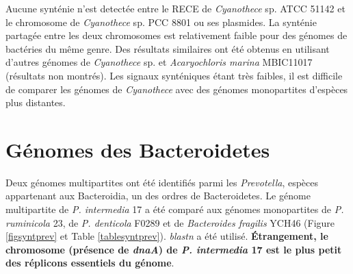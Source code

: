 Aucune synténie n'est detectée entre le RECE de \textit{Cyanothece} sp. ATCC 51142 et le chromosome de \textit{Cyanothece} sp. PCC 8801 ou ses plasmides. La synténie partagée entre les deux chromosomes est relativement faible pour des génomes de bactéries du même genre. Des résultats similaires ont été obtenus en utilisant d'autres génomes de \textit{Cyanothece} sp. et \textit{Acaryochloris marina} MBIC11017 (résultats non montrés). Les signaux synténiques étant très faibles, il est difficile de comparer les génomes de \textit{Cyanothece} avec des génomes monopartites d'espèces plus distantes.



\section{Génomes des Bacteroidetes}\label{parprev}
	Deux génomes multipartites ont été identifiés parmi les \textit{Prevotella}, espèces appartenant aux Bacteroidia, un des ordres de Bacteroidetes. Le génome multipartite de \textit{P. intermedia} 17 a été comparé aux génomes monopartites de \textit{P. ruminicola} 23, de \textit{P. denticola} F0289 et de \textit{Bacteroides fragilis} YCH46 (Figure \ref{figsyntprev} et Table \ref{tablesyntprev}). \textit{blastn} a été utilisé. \textbf{Étrangement, le chromosome (présence de \textit{dnaA}) de \textit{P. intermedia} 17 est le plus petit des réplicons essentiels du génome}. 

